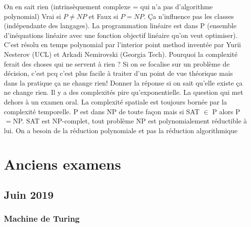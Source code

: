 \begin{mcqs}
  {On en sait rien (intrinsèquement complexe = qui n'a pas d'algorithme polynomial) Vrai si $P \neq NP$ et Faux si $P=NP$.}
  {Ça n'influence pas les classes (indépendante des langages).}
  {La programmation linéaire est dans P (ensemble d'inéquations linéaire avec une fonction objectif linéaire qu'on veut optimiser).
  C'est résolu en temps polynomial par l'interior point method inventée par Yurii Nesterov (UCL) et Arkadi Nemirovski (Georgia Tech).}
  {Pourquoi la complexité ferait des choses qui ne servent à rien ? Si on se focalise sur un problème de décision, c'est pcq c'est plus facile à traiter d'un point de vue théorique mais dans la pratique ça ne change rien! Donner la réponse si on sait qu'elle existe ça ne change rien.}
  {Il y a des complexités pire qu'exponentielle.}
  {La question qui met dehors à un examen oral.}
  {La complexité spatiale est toujours bornée par la complexité temporelle.}
  {P est dans NP de toute façon mais si SAT $\in$ P alors P${}={}$NP.}
  {SAT est NP-complet, tout problème NP est polynomialement réductible à lui.}
  {On a besoin de la réduction polynomiale et pas la réduction algorithmique}
\end{mcqs}

\chapter{Anciens examens}

\section{Juin 2019}

\subsection*{Machine de Turing}

